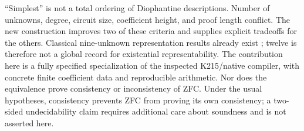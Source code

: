``Simplest'' is not a total ordering of Diophantine descriptions.
Number of unknowns, degree, circuit size, coefficient height, and proof
length conflict.  The new construction improves two of these criteria
and supplies explicit tradeoffs for the others.
Classical nine-unknown representation results already exist
\cite{Jones1982,BayerDavid2025}; twelve is therefore not a global record
for existential representability.  The contribution here is a fully
specified specialization of the inspected K215/native compiler, with
concrete finite coefficient data and reproducible arithmetic.
Nor does the equivalence prove consistency or inconsistency of ZFC.
Under the usual hypotheses, consistency prevents ZFC from proving its
own consistency; a two-sided undecidability claim requires additional
care about soundness and is not asserted here.
